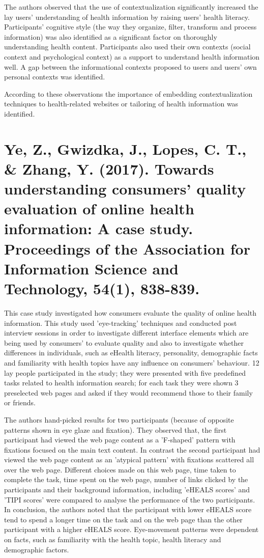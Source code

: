 \documentclass[]{article}
\begin{document}
The authors observed that the use of contextualization significantly increased the lay users' understanding of health information by raising users' health literacy. Participants' cognitive style (the way they organize, filter, transform and process information) was also identified as a significant factor on thoroughly understanding health content. Participants also used their own contexts (social context and psychological context) as a support to understand health information well. A gap between the informational contexts proposed to users and users' own personal contexts was identified.  

According to these observations the importance of embedding contextualization techniques to health-related websites or tailoring of health information was identified. 

\section{Ye, Z., Gwizdka, J., Lopes, C. T., \& Zhang, Y. (2017). Towards understanding consumers' quality evaluation of online health information: A case study. Proceedings of the Association for Information Science and Technology, 54(1), 838-839.}

This case study investigated how consumers evaluate the quality of online health information. This study used 'eye-tracking' techniques and conducted post interview sessions in order to investigate different interface elements which are being used by consumers' to evaluate quality and also to investigate whether differences in individuals, such as eHealth literacy, personality, demographic facts and familiarity with health topics have any influence on consumers' behaviour. 12 lay people participated in the study; they were presented with five predefined tasks related to health information search; for each task they were shown 3 preselected web pages and asked if they would recommend those to their family or friends. 

The authors hand-picked results for two participants (because of opposite patterns shown in eye glaze and fixation). They observed that, the first participant had viewed the web page content as a 'F-shaped' pattern with fixations focused on the main text content. In contrast the second participant had viewed the web page content as an 'atypical pattern' with fixations scattered all over the web page. Different choices made on this web page, time taken to complete the task, time spent on the web page, number of links clicked by the participants and their background information, including 'eHEALS scores' and 'TIPI scores' were compared to analyse the performance of the two participants. In conclusion, the authors noted that the participant with lower eHEALS score tend to spend a longer time on the task and on the web page than the other participant with a higher eHEALS score. Eye-movement patterns were dependent on facts, such as familiarity with the health topic, health literacy and demographic factors.               
\end{document}
